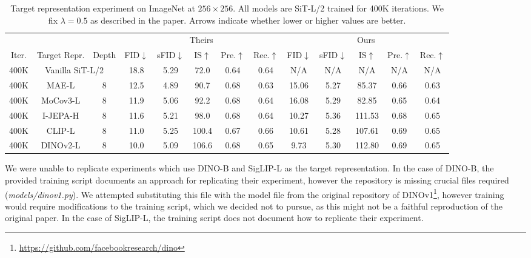 \documentclass{article}
\begin{document}
\begin{table}[t]
\centering
\begin{tabular}{ccc|ccccc|ccccc}
\toprule
& & & \multicolumn{5}{c|}{Theirs} & \multicolumn{5}{c}{Ours} \\
Iter. & Target Repr. & Depth
& FID$\downarrow$ & sFID$\downarrow$ & IS$\uparrow$ & Pre.$\uparrow$ & Rec.$\uparrow$
& FID$\downarrow$ & sFID$\downarrow$ & IS$\uparrow$ & Pre.$\uparrow$ & Rec.$\uparrow$ \\
\midrule
400K & \multicolumn{2}{c|}{Vanilla SiT-L/2~\cite{sit}}
& 18.8 & 5.29 & 72.0 & 0.64 & 0.64
& N/A & N/A & N/A & N/A & N/A \\
\hline
400K & MAE-L & 8
& 12.5 & 4.89 & 90.7 & 0.68 & 0.63
& 15.06 & 5.27 & 85.37 & 0.66 & 0.63 \\
400K & MoCov3-L & 8
& 11.9 & 5.06 & 92.2 & 0.68 & 0.64
& 16.08 & 5.29 & 82.85 & 0.65 & 0.64 \\
400K & I-JEPA-H & 8
& 11.6 & 5.21 & 98.0 & 0.68 & 0.64
& 10.27 & 5.36 & 111.53 & 0.68 & 0.65 \\
400K & CLIP-L & 8
& 11.0 & 5.25 & 100.4 & 0.67 & 0.66
& 10.61 & 5.28 & 107.61 & 0.69 & 0.65 \\
400K & DINOv2-L & 8
& 10.0 & 5.09 & 106.6 & 0.68 & 0.65
& 9.73 & 5.30 & 112.80 & 0.69 & 0.65 \\
\bottomrule
\end{tabular}
\caption{Target representation experiment on ImageNet at $256\times256$. All models are SiT-L/2 trained for 400K iterations. We fix $\lambda=0.5$ as described in the paper. Arrows indicate whether lower or higher values are better.}
\label{tab:repa-target-rep}
\label{tab:target-representation}
\end{table}


We were unable to replicate experiments which use DINO-B and SigLIP-L as the target representation. In the case of DINO-B, the provided training script documents an approach for replicating their experiment, however the repository is missing crucial files required (\textit{models/dinov1.py}). We attempted substituting this file with the model file from the original repository of DINOv1\footnote{\href{https://github.com/facebookresearch/dino}{https://github.com/facebookresearch/dino}}, however training would require modifications to the training script, which we decided not to pursue, as this might not be a faithful reproduction of the original paper. In the case of SigLIP-L, the training script does not document how to replicate their experiment.   
\end{document}
